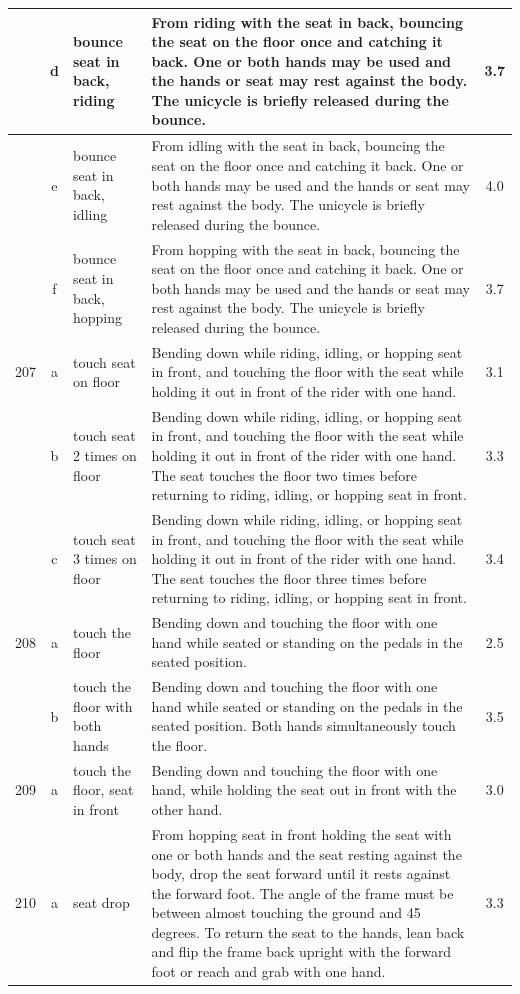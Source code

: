 \begin{longtable}{|r|c|p{4cm}|p{8cm}|c|}
\hline
  & d & bounce seat in back, riding & From riding with the seat in back, bouncing the seat on the floor once and catching it back. One or both hands may be used and the hands or seat may rest against the body. The unicycle is briefly released during the bounce. & 3.7 \\ 
\hline
  & e & bounce seat in back, idling & From idling with the seat in back, bouncing the seat on the floor once and catching it back. One or both hands may be used and the hands or seat may rest against the body. The unicycle is briefly released during the bounce. & 4.0 \\ 
\hline
  & f & bounce seat in back, hopping  & From hopping with the seat in back, bouncing the seat on the floor once and catching it back. One or both hands may be used and the hands or seat may rest against the body. The unicycle is briefly released during the bounce.  & 3.7 \\ 
\hline
207 & a & touch seat on floor & Bending down while riding, idling, or hopping seat in front, and touching the floor with the seat while holding it out in front of the rider with one hand. & 3.1 \\ 
\hline
  & b & touch seat 2 times on floor & Bending down while riding, idling, or hopping seat in front, and touching the floor with the seat while holding it out in front of the rider with one hand. The seat touches the floor two times before returning to riding, idling, or hopping seat in front.  & 3.3 \\ 
\hline
  & c & touch seat 3 times on floor & Bending down while riding, idling, or hopping seat in front, and touching the floor with the seat while holding it out in front of the rider with one hand. The seat touches the floor three times before returning to riding, idling, or hopping seat in front.  & 3.4 \\ 
\hline
208 & a & touch the floor & Bending down and touching the floor with one hand while seated or standing on the pedals in the seated position.  & 2.5 \\ 
\hline
  & b & touch the floor with both hands & Bending down and touching the floor with one hand while seated or standing on the pedals in the seated position. Both hands simultaneously touch the floor. & 3.5 \\ 
\hline
209 & a & touch the floor, seat in front  & Bending down and touching the floor with one hand, while holding the seat out in front with the other hand. & 3.0 \\ 
\hline
210 & a & seat drop & From hopping seat in front holding the seat with one or both hands and the seat resting against the body, drop the seat forward until it rests against the forward foot. The angle of the frame must be between almost touching the ground and 45 degrees. To return the seat to the hands, lean back and flip the frame back upright with the forward foot or reach and grab with one hand.  & 3.3 \\ 

\end{longtable}
